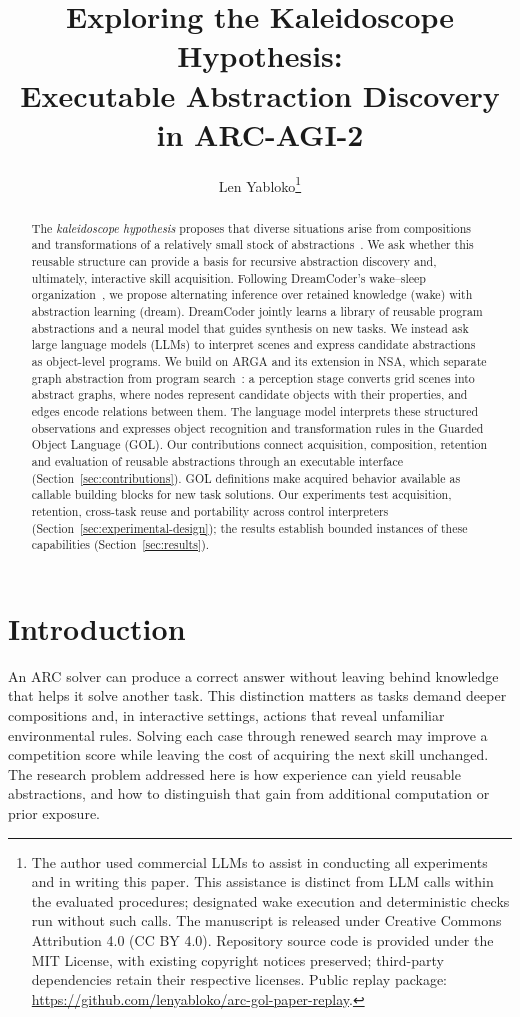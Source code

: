 \documentclass[11pt]{article}
\title{Exploring the Kaleidoscope Hypothesis:\\Executable Abstraction Discovery in ARC-AGI-2}
\author{Len Yabloko\thanks{The author used commercial LLMs to assist in conducting all experiments and in writing this paper. This assistance is distinct from LLM calls within the evaluated procedures; designated wake execution and deterministic checks run without such calls. The manuscript is released under Creative Commons Attribution 4.0 (CC BY 4.0). Repository source code is provided under the MIT License, with existing copyright notices preserved; third-party dependencies retain their respective licenses. Public replay package: \url{https://github.com/lenyabloko/arc-gol-paper-replay}.}}
\date{}
\begin{document}
\begingroup
\let\fnsymbol\arabic
\maketitle
\endgroup
\setcounter{footnote}{1}
\begin{abstract}
The \emph{kaleidoscope hypothesis} proposes that diverse situations arise from compositions and transformations of a relatively small stock of abstractions~\cite{chollet2020,chollet2024}. We ask whether this reusable structure can provide a basis for recursive abstraction discovery and, ultimately, interactive skill acquisition. Following DreamCoder's wake--sleep organization~\cite{dreamcoder}, we propose alternating inference over retained knowledge (wake) with abstraction learning (dream). DreamCoder jointly learns a library of reusable program abstractions and a neural model that guides synthesis on new tasks. We instead ask large language models (LLMs) to interpret scenes and express candidate abstractions as object-level programs. We build on ARGA and its extension in NSA, which separate graph abstraction from program search~\cite{arga,nsa}: a perception stage converts grid scenes into abstract graphs, where nodes represent candidate objects with their properties, and edges encode relations between them. The language model interprets these structured observations and expresses object recognition and transformation rules in the Guarded Object Language (GOL). Our contributions connect acquisition, composition, retention and evaluation of reusable abstractions through an executable interface (Section~\ref{sec:contributions}). GOL definitions make acquired behavior available as callable building blocks for new task solutions. Our experiments test acquisition, retention, cross-task reuse and portability across control interpreters (Section~\ref{sec:experimental-design}); the results establish bounded instances of these capabilities (Section~\ref{sec:results}).
\end{abstract}

\section{Introduction}
An ARC solver can produce a correct answer without leaving behind knowledge that helps it solve another task. This distinction matters as tasks demand deeper compositions and, in interactive settings, actions that reveal unfamiliar environmental rules. Solving each case through renewed search may improve a competition score while leaving the cost of acquiring the next skill unchanged. The research problem addressed here is how experience can yield reusable abstractions, and how to distinguish that gain from additional computation or prior exposure.
\end{document}
